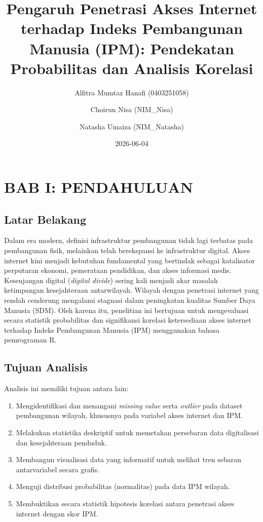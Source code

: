 \documentclass[
  letterpaper,
  DIV=11,
  numbers=noendperiod]{scrartcl}
\title{Pengaruh Penetrasi Akses Internet terhadap Indeks Pembangunan
Manusia (IPM): Pendekatan Probabilitas dan Analisis Korelasi}
\author{Alfitra Mumtaz Hanafi (0403251058) \and Choirun Nisa
(NIM\_Nisa) \and Natasha Umaiza (NIM\_Natasha)}
\date{2026-06-04}
\providecommand{\tightlist}{%
  \setlength{\itemsep}{0pt}\setlength{\parskip}{0pt}}
\renewcommand*\contentsname{Table of contents}
\newcommand\contentsname{Table of contents}
\begin{document}
\maketitle

\renewcommand*\contentsname{Table of contents}
{
\setcounter{tocdepth}{3}
\tableofcontents
}

\section{BAB I: PENDAHULUAN}\label{bab-i-pendahuluan}

\subsection{Latar Belakang}\label{latar-belakang}

Dalam era modern, definisi infrastruktur pembangunan tidak lagi terbatas
pada pembangunan fisik, melainkan telah berekspansi ke infrastruktur
digital. Akses internet kini menjadi kebutuhan fundamental yang
bertindak sebagai katalisator perputaran ekonomi, pemerataan pendidikan,
dan akses informasi medis. Kesenjangan digital (\emph{digital divide})
sering kali menjadi akar masalah ketimpangan kesejahteraan antarwilayah.
Wilayah dengan penetrasi internet yang rendah cenderung mengalami
stagnasi dalam peningkatan kualitas Sumber Daya Manusia (SDM). Oleh
karena itu, penelitian ini bertujuan untuk mengevaluasi secara statistik
probabilitas dan signifikansi korelasi ketersediaan akses internet
terhadap Indeks Pembangunan Manusia (IPM) menggunakan bahasa pemrograman
R.

\subsection{Tujuan Analisis}\label{tujuan-analisis}

Analisis ini memiliki tujuan antara lain:

\begin{enumerate}
\def\labelenumi{\arabic{enumi}.}
\tightlist
\item
  Mengidentifikasi dan menangani \emph{missing value} serta
  \emph{outlier} pada dataset pembangunan wilayah, khususnya pada
  variabel akses internet dan IPM.
\item
  Melakukan statistika deskriptif untuk memetakan persebaran data
  digitalisasi dan kesejahteraan penduduk.
\item
  Membangun visualisasi data yang informatif untuk melihat tren sebaran
  antarvariabel secara grafis.
\item
  Menguji distribusi probabilitas (normalitas) pada data IPM wilayah.
\item
  Membuktikan secara statistik hipotesis korelasi antara penetrasi akses
  internet dengan skor IPM.
\end{enumerate}
\end{document}
